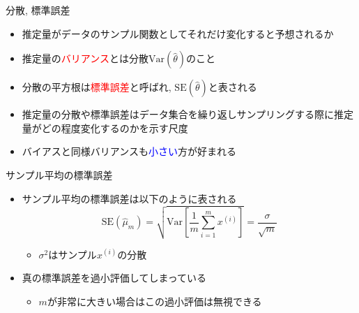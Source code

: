 \documentclass[dvipdfmx, 10pt]{beamer}
\begin{document}
\begin{frame}{分散, 標準誤差}
  \begin{itemize}
    \item 推定量がデータのサンプル関数としてそれだけ変化すると予想されるか
    \item 推定量の\textcolor{red}{バリアンス}とは分散$\mathrm{Var}(\hat{\theta})$のこと
    \item 分散の平方根は\textcolor{red}{標準誤差}と呼ばれ, $\mathrm{SE}(\hat{\theta})$と表される
    \item 推定量の分散や標準誤差はデータ集合を繰り返しサンプリングする際に推定量がどの程度変化するのかを示す尺度
    \item バイアスと同様バリアンスも\textcolor{blue}{小さい}方が好まれる
  \end{itemize}
  \begin{exampleblock}{サンプル平均の標準誤差}
    \begin{itemize}
      \item サンプル平均の標準誤差は以下のように表される
		\begin{equation}
		  \mathrm{SE}(\hat{\mu}_{m}) = \sqrt{\mathrm{Var} \left[ \dfrac{1} {m} \sum_{i=1}^{m} x^{(i)} \right]} = \dfrac{\sigma} {\sqrt{m}}
		\end{equation}
		\begin{itemize}
		\item $\sigma^{2}$はサンプル$x^{(i)}$の分散
		\end{itemize}
      \item 真の標準誤差を過小評価してしまっている
      \begin{itemize}
        \item $m$が非常に大きい場合はこの過小評価は無視できる
      \end{itemize}
    \end{itemize}
  \end{exampleblock}
\end{frame}

\end{document}
